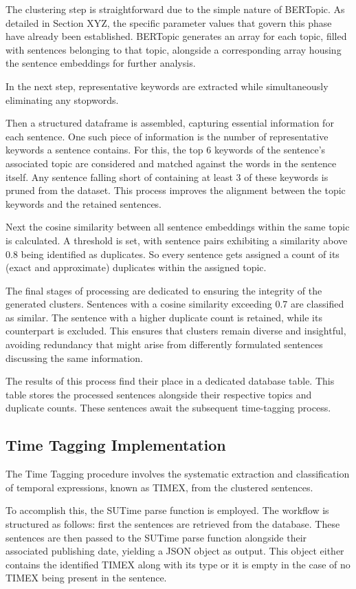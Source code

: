 \documentclass[a4paper,10pt]{report} %
\begin{document}
The clustering step is straightforward due to the simple nature of BERTopic. As detailed in Section XYZ, the specific parameter values that govern this phase have already been established. BERTopic generates an array for each topic, filled with sentences belonging to that topic, alongside a corresponding array housing the sentence embeddings for further analysis.

In the next step, representative keywords are extracted while simultaneously eliminating any stopwords.

Then a structured dataframe is assembled, capturing essential information for each sentence. One such piece of information is the number of representative keywords a sentence contains. For this, the top 6 keywords of the sentence's associated topic are considered and matched against the words in the sentence itself. Any sentence falling short of containing at least 3 of these keywords is pruned from the dataset. This process improves the alignment between the topic keywords and the retained sentences.

Next the cosine similarity between all sentence embeddings within the same topic is calculated. A threshold is set, with sentence pairs exhibiting a similarity above 0.8 being identified as duplicates. So every sentence gets assigned a count of its (exact and approximate) duplicates within the assigned topic.

The final stages of processing are dedicated to ensuring the integrity of the generated clusters. Sentences with a cosine similarity exceeding 0.7 are classified as similar. The sentence with a higher duplicate count is retained, while its counterpart is excluded. This ensures that clusters remain diverse and insightful, avoiding redundancy that might arise from differently formulated sentences discussing the same information.

The results of this process find their place in a dedicated database table. This table stores the processed sentences alongside their respective topics and duplicate counts. These sentences await the subsequent time-tagging process.

\subsection{Time Tagging Implementation}
The Time Tagging procedure involves the systematic extraction and classification of temporal expressions, known as TIMEX, from the clustered sentences.

To accomplish this, the SUTime parse function is employed. The workflow is structured as follows: first the sentences are retrieved from the database. These sentences are then passed to the SUTime parse function alongside their associated publishing date, yielding a JSON object as output. This object either contains the identified TIMEX along with its type or it is empty in the case of no TIMEX being present in the sentence.
\end{document}
